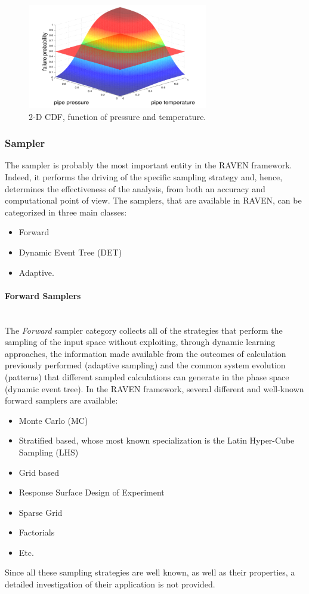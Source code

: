 \begin{figure}
  \centering
  \includegraphics[width=0.7\textwidth]  {pics/NDimensionalDistributionExample.png}
  \caption{2-D CDF, function of pressure and temperature.}
  \label{fig:NDDistributionExample}
\end{figure}

\subsubsection{Sampler}
\label{susub:OverviewSamplers}
The sampler is probably the most important entity in the RAVEN framework. Indeed, it performs the driving of the specific sampling strategy and, hence, determines the effectiveness of the analysis, from both an accuracy and computational point of view.  The samplers, that are available in RAVEN, can be categorized in three main classes:
\begin{itemize}
 \item Forward
 \item Dynamic Event Tree (DET)
 \item Adaptive.
\end{itemize}
\paragraph{Forward Samplers} ~\\ 
The \textit{Forward} sampler category collects all of the strategies that perform the sampling of the input space without exploiting, through dynamic learning approaches, the information made available from the outcomes of calculation previously performed (adaptive sampling) and the common system evolution (patterns) that different sampled calculations can generate in the phase space (dynamic event tree). 
In the RAVEN framework, several different and well-known forward samplers are available:
\begin{itemize}
\item Monte Carlo (MC)
\item Stratified based, whose most known specialization is the Latin Hyper-Cube Sampling (LHS)
\item Grid based
\item Response Surface Design of Experiment
\item Sparse Grid
\item Factorials
\item Etc.
\end{itemize}
Since all these sampling strategies are well known, as well as their properties, a detailed investigation of their application is not provided.
